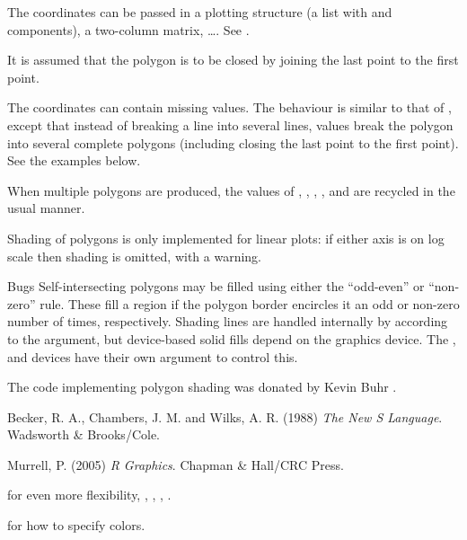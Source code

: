 %
\begin{Details}\relax
The coordinates can be passed in a plotting structure
(a list with  and  components), a two-column matrix,
\dots.  See .

It is assumed that the polygon is to be closed by joining the last
point to the first point.

The coordinates can contain missing values.  The behaviour is similar
to that of , except that instead of breaking a line
into several lines,  values break the polygon into several
complete polygons (including closing the last point to the first
point).  See the examples below.

When multiple polygons are produced, the values of ,
, , , and  are recycled
in the usual manner.

Shading of polygons is only implemented for linear plots: if either
axis is on log scale then shading is omitted, with a warning.
\end{Details}
%
\begin{Section}{Bugs}
Self-intersecting polygons may be filled using either the
``odd-even'' or ``non-zero'' rule.  These fill a region if
the polygon border encircles it an odd or non-zero number of times,
respectively.  Shading lines are handled internally by \R{} according
to the  argument, but device-based solid fills
depend on the graphics device.  The , 
and  devices have their own 
argument to control this.
\end{Section}
%
\begin{Author}\relax
The code implementing polygon shading was donated by
Kevin Buhr .
\end{Author}
%
\begin{References}\relax
Becker, R. A., Chambers, J. M. and Wilks, A. R. (1988)
\emph{The New S Language}.
Wadsworth \& Brooks/Cole.

Murrell, P. (2005) \emph{R Graphics}. Chapman \& Hall/CRC Press.
\end{References}
%
\begin{SeeAlso}\relax
{} for even more flexibility, ,
, , .

 for how to specify colors.
\end{SeeAlso}
